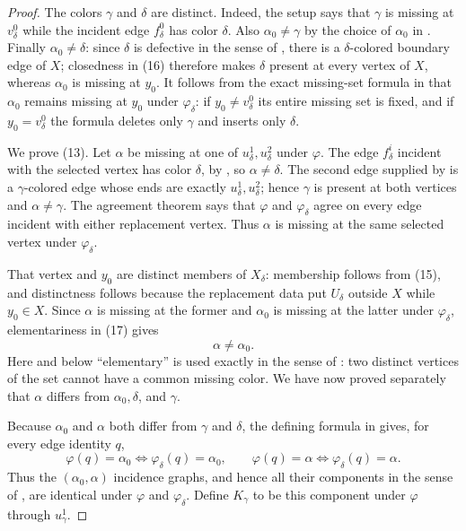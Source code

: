 \begin{proof}
The colors $\gamma$ and $\delta$ are distinct.  Indeed, the setup says
that $\gamma$ is missing at $v^0_\delta$ while the incident edge
$f^0_\delta$ has color $\delta$.  Also $\alpha_0\ne\gamma$ by the
choice of $\alpha_0$ in .  Finally
$\alpha_0\ne\delta$: since $\delta$ is defective in the sense of
, there is a $\delta$-colored boundary edge of
$X$; closedness in (16) therefore makes $\delta$ present at every vertex
of $X$, whereas $\alpha_0$ is missing at $y_0$.  It follows from the
exact missing-set formula in  that
$\alpha_0$ remains missing at $y_0$ under $\varphi_\delta$: if
$y_0\ne v^0_\delta$ its entire missing set is fixed, and if
$y_0=v^0_\delta$ the formula deletes only $\gamma$ and inserts only
$\delta$.

We prove (13).  Let $\alpha$ be missing at one of
$u^1_\delta,u^2_\delta$ under $\varphi$.  The edge $f^i_\delta$ incident
with the selected vertex has color $\delta$, by
, so $\alpha\ne\delta$.
The second edge supplied by
 is a $\gamma$-colored edge
whose ends are exactly $u^1_\delta,u^2_\delta$; hence $\gamma$ is present
at both vertices and $\alpha\ne\gamma$.  The agreement theorem
 says that $\varphi$ and
$\varphi_\delta$ agree on every edge incident with either replacement
vertex.  Thus $\alpha$ is missing at the same selected vertex under
$\varphi_\delta$.

That vertex and $y_0$ are distinct members of $X_\delta$: membership
follows from (15), and distinctness follows because the replacement data
put $U_\delta$ outside $X$ while $y_0\in X$.  Since $\alpha$ is missing
at the former and $\alpha_0$ is missing at the latter under
$\varphi_\delta$, elementariness in (17) gives
\[
 \alpha\ne\alpha_0.                                          \tag{18}
\]
Here and below ``elementary'' is used exactly in the sense of
: two distinct vertices of the set
cannot have a common missing color.
We have now proved separately that $\alpha$ differs from
$\alpha_0,\delta$, and $\gamma$.

Because $\alpha_0$ and $\alpha$ both differ from $\gamma$ and $\delta$,
the defining formula in  gives, for every
edge identity $q$,
\[
 \varphi(q)=\alpha_0\Longleftrightarrow
 \varphi_\delta(q)=\alpha_0,
 \qquad
 \varphi(q)=\alpha\Longleftrightarrow
 \varphi_\delta(q)=\alpha.                                  \tag{19}
\]
Thus the $(\alpha_0,\alpha)$ incidence graphs, and hence all their
components in the sense of , are identical
under $\varphi$ and $\varphi_\delta$.  Define $K_\gamma$ to be this
component under $\varphi$ through $u^1_\gamma$.


\end{proof}

